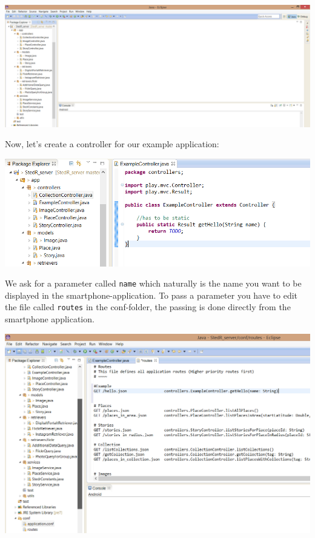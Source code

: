 \begin{center}
\includegraphics[scale=0.4]{guide/eclipse1.png} 
\end{center}

Now, let's create a controller for our example application:


\begin{center}
\includegraphics[scale=0.7]{guide/eclipse2.png} 
\end{center}

We ask for a parameter called \texttt{name} which naturally is the name you want to be displayed in the smartphone-application. To pass a parameter you have to edit the file called \texttt{routes} in the conf-folder, the passing is done directly from the smartphone application.

\begin{center}
\includegraphics[scale=0.5]{guide/eclipse3.png} 
\end{center}

